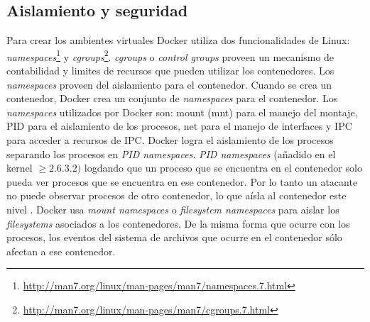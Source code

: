 \subsection{Aislamiento y seguridad}
Para crear los ambientes virtuales Docker utiliza dos funcionalidades de Linux: \emph{namespaces}\footnote{\url{http://man7.org/linux/man-pages/man7/namespaces.7.html}} y \emph{cgroups}\footnote{\url{http://man7.org/linux/man-pages/man7/cgroups.7.html}}. \emph{cgroups} o \emph{control groups} proveen un mecanismo de contabilidad y limites de recursos que pueden utilizar los contenedores\cite{bui2015analysis}. Los \emph{namespaces} proveen del aislamiento para el contenedor. 
Cuando se crea un contenedor, Docker crea un conjunto de \emph{namespaces} para el contenedor. Los \emph{namespaces} utilizados por Docker son: mount (mnt) para el manejo del montaje, PID para el aislamiento de los procesos, net para el manejo de interfaces y IPC para acceder a recursos de IPC. 
Docker logra el aislamiento de los procesos separando los procesos en \emph{PID namespaces}.
\emph{PID namespaces} (añadido en el kernel \( \geq 2.6.3.2)\) logdando que un proceso que se encuentra en el contenedor solo pueda ver procesos que se encuentra en ese contenedor. Por lo tanto un atacante no puede observar procesos de otro contenedor, lo que aísla al contenedor este nivel \cite{bui2015analysis}.
Docker usa \emph{mount namespaces} o \emph{filesystem namespaces} para aislar los \emph{filesystems} asociados a los contenedores. De la misma forma que ocurre con los procesos, los eventos del sistema de archivos que ocurre en el contenedor sólo afectan a ese contenedor.

